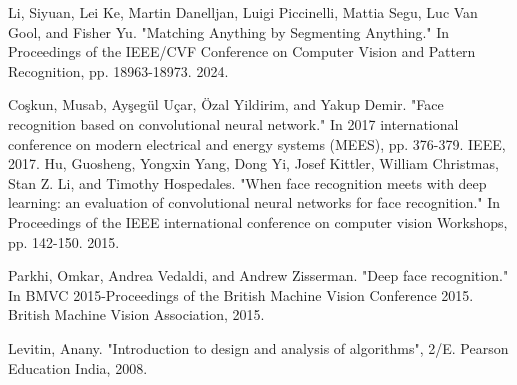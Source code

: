 \documentclass[12pt,a4paper]{report}
\begin{document}
\begin{thebibliography}{35}
Li, Siyuan, Lei Ke, Martin Danelljan, Luigi Piccinelli, Mattia Segu, Luc Van Gool, and Fisher Yu. "Matching Anything by Segmenting Anything." In Proceedings of the IEEE/CVF Conference on Computer Vision and Pattern Recognition, pp. 18963-18973. 2024.

Coşkun, Musab, Ayşegül Uçar, Özal Yildirim, and Yakup Demir. "Face recognition based on convolutional neural network." In 2017 international conference on modern electrical and energy systems (MEES), pp. 376-379. IEEE, 2017.
Hu, Guosheng, Yongxin Yang, Dong Yi, Josef Kittler, William Christmas, Stan Z. Li, and Timothy Hospedales. "When face recognition meets with deep learning: an evaluation of convolutional neural networks for face recognition." In Proceedings of the IEEE international conference on computer vision Workshops, pp. 142-150. 2015.

Parkhi, Omkar, Andrea Vedaldi, and Andrew Zisserman. "Deep face recognition." In BMVC 2015-Proceedings of the British Machine Vision Conference 2015. British Machine Vision Association, 2015.

Levitin, Anany. "Introduction to design and analysis of algorithms", 2/E. Pearson Education India, 2008.


\end{thebibliography}
\end{document}
